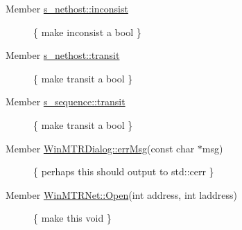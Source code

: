 \label{todo__todo000002}
\hypertarget{todo__todo000002}{}
 \begin{description}
\item[Member \hyperlink{structs__nethost_badb6cdfcc0c2350885aa95b47aa7e68}{s\_\-nethost::inconsist} ]\{ make inconsist a bool \} \end{description}


\label{todo__todo000003}
\hypertarget{todo__todo000003}{}
 \begin{description}
\item[Member \hyperlink{structs__nethost_cedbbf6771d0cf034f5a31cccc7e41ec}{s\_\-nethost::transit} ]\{ make transit a bool \} \end{description}


\label{todo__todo000004}
\hypertarget{todo__todo000004}{}
 \begin{description}
\item[Member \hyperlink{structs__sequence_23243cbea1f63fecfb2c0fb863e8d8d6}{s\_\-sequence::transit} ]\{ make transit a bool \} \end{description}


\label{todo__todo000001}
\hypertarget{todo__todo000001}{}
 \begin{description}
\item[Member \hyperlink{classWinMTRDialog_b7ff762dde134250e3b713d8d56904ae}{WinMTRDialog::errMsg}(const char $\ast$msg) ]\{ perhaps this should output to std::cerr \} \end{description}


\label{todo__todo000005}
\hypertarget{todo__todo000005}{}
 \begin{description}
\item[Member \hyperlink{classWinMTRNet_98e9dd94f9400ea00c547669a9386fdc}{WinMTRNet::Open}(int address, int laddress) ]\{ make this void \} \end{description}

